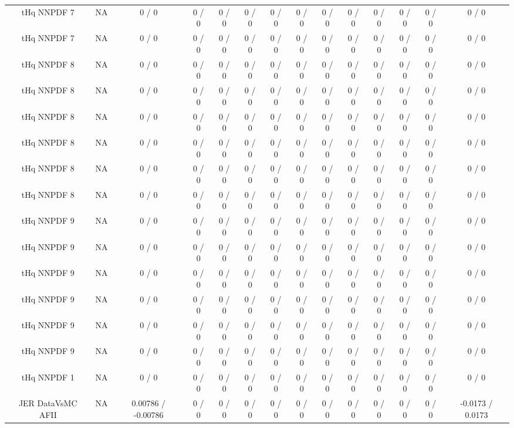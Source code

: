 \documentclass[10pt]{article}
\begin{document}
\begin{table}[htbp]
\begin{center}
\begin{tabular}{|c|c|c|c|c|c|c|c|c|c|c|c|c|c|}
  tHq NNPDF 7 &    NA    & 0 / 0 & 0 / 0 & 0 / 0 & 0 / 0 & 0 / 0 & 0 / 0 & 0 / 0 & 0 / 0 & 0 / 0 & 0 / 0 & 0 / 0 & 0 / 0 \\ 
  tHq NNPDF 7 &    NA    & 0 / 0 & 0 / 0 & 0 / 0 & 0 / 0 & 0 / 0 & 0 / 0 & 0 / 0 & 0 / 0 & 0 / 0 & 0 / 0 & 0 / 0 & 0 / 0 \\ 
  tHq NNPDF 8 &    NA    & 0 / 0 & 0 / 0 & 0 / 0 & 0 / 0 & 0 / 0 & 0 / 0 & 0 / 0 & 0 / 0 & 0 / 0 & 0 / 0 & 0 / 0 & 0 / 0 \\ 
  tHq NNPDF 8 &    NA    & 0 / 0 & 0 / 0 & 0 / 0 & 0 / 0 & 0 / 0 & 0 / 0 & 0 / 0 & 0 / 0 & 0 / 0 & 0 / 0 & 0 / 0 & 0 / 0 \\ 
  tHq NNPDF 8 &    NA    & 0 / 0 & 0 / 0 & 0 / 0 & 0 / 0 & 0 / 0 & 0 / 0 & 0 / 0 & 0 / 0 & 0 / 0 & 0 / 0 & 0 / 0 & 0 / 0 \\ 
  tHq NNPDF 8 &    NA    & 0 / 0 & 0 / 0 & 0 / 0 & 0 / 0 & 0 / 0 & 0 / 0 & 0 / 0 & 0 / 0 & 0 / 0 & 0 / 0 & 0 / 0 & 0 / 0 \\ 
  tHq NNPDF 8 &    NA    & 0 / 0 & 0 / 0 & 0 / 0 & 0 / 0 & 0 / 0 & 0 / 0 & 0 / 0 & 0 / 0 & 0 / 0 & 0 / 0 & 0 / 0 & 0 / 0 \\ 
  tHq NNPDF 8 &    NA    & 0 / 0 & 0 / 0 & 0 / 0 & 0 / 0 & 0 / 0 & 0 / 0 & 0 / 0 & 0 / 0 & 0 / 0 & 0 / 0 & 0 / 0 & 0 / 0 \\ 
  tHq NNPDF 9 &    NA    & 0 / 0 & 0 / 0 & 0 / 0 & 0 / 0 & 0 / 0 & 0 / 0 & 0 / 0 & 0 / 0 & 0 / 0 & 0 / 0 & 0 / 0 & 0 / 0 \\ 
  tHq NNPDF 9 &    NA    & 0 / 0 & 0 / 0 & 0 / 0 & 0 / 0 & 0 / 0 & 0 / 0 & 0 / 0 & 0 / 0 & 0 / 0 & 0 / 0 & 0 / 0 & 0 / 0 \\ 
  tHq NNPDF 9 &    NA    & 0 / 0 & 0 / 0 & 0 / 0 & 0 / 0 & 0 / 0 & 0 / 0 & 0 / 0 & 0 / 0 & 0 / 0 & 0 / 0 & 0 / 0 & 0 / 0 \\ 
  tHq NNPDF 9 &    NA    & 0 / 0 & 0 / 0 & 0 / 0 & 0 / 0 & 0 / 0 & 0 / 0 & 0 / 0 & 0 / 0 & 0 / 0 & 0 / 0 & 0 / 0 & 0 / 0 \\ 
  tHq NNPDF 9 &    NA    & 0 / 0 & 0 / 0 & 0 / 0 & 0 / 0 & 0 / 0 & 0 / 0 & 0 / 0 & 0 / 0 & 0 / 0 & 0 / 0 & 0 / 0 & 0 / 0 \\ 
  tHq NNPDF 9 &    NA    & 0 / 0 & 0 / 0 & 0 / 0 & 0 / 0 & 0 / 0 & 0 / 0 & 0 / 0 & 0 / 0 & 0 / 0 & 0 / 0 & 0 / 0 & 0 / 0 \\ 
  tHq NNPDF 1 &    NA    & 0 / 0 & 0 / 0 & 0 / 0 & 0 / 0 & 0 / 0 & 0 / 0 & 0 / 0 & 0 / 0 & 0 / 0 & 0 / 0 & 0 / 0 & 0 / 0 \\ 
  JER DataVsMC AFII &    NA    & 0.00786 / -0.00786 & 0 / 0 & 0 / 0 & 0 / 0 & 0 / 0 & 0 / 0 & 0 / 0 & 0 / 0 & 0 / 0 & 0 / 0 & 0 / 0 & -0.0173 / 0.0173 \\ 

\end{tabular}
\end{center}
\end{table}
\end{document}
